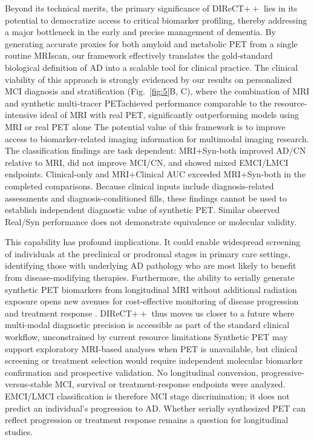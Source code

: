 \documentclass{article}
\providecommand{\DIFaddtex}[1]{{\protect\color{blue} \sf #1}} %
\providecommand{\DIFdeltex}[1]{{\protect\color{red} \scriptsize #1}} %
\providecommand{\DIFaddbegin}{} %
\providecommand{\DIFaddend}{} %
\providecommand{\DIFdelbegin}{} %
\providecommand{\DIFdelend}{} %
\providecommand{\DIFadd}[1]{\texorpdfstring{\DIFaddtex{#1}}{#1}} %
\providecommand{\DIFdel}[1]{\texorpdfstring{\DIFdeltex{#1}}{}} %
\newcommand{\DIFscaledelfig}{0.5}
\newlength{\DIFdelgraphicswidth} %
\newlength{\DIFdelgraphicsheight} %
\newcommand{\DIFaddincludegraphics}[2][]{{\color{blue}\fbox{\DIFOincludegraphics[#1]{#2}}}} %
\newcommand{\DIFdelincludegraphics}[2][]{%
\sbox{\DIFdelgraphicsbox}{\DIFOincludegraphics[#1]{#2}}%
\settoboxwidth{\DIFdelgraphicswidth}{\DIFdelgraphicsbox} %
\settoboxtotalheight{\DIFdelgraphicsheight}{\DIFdelgraphicsbox} %
\scalebox{\DIFscaledelfig}{%
\parbox[b]{\DIFdelgraphicswidth}{\usebox{\DIFdelgraphicsbox}\\[-\baselineskip] \rule{\DIFdelgraphicswidth}{0em}}\llap{\resizebox{\DIFdelgraphicswidth}{\DIFdelgraphicsheight}{%
\setlength{\unitlength}{\DIFdelgraphicswidth}%
\begin{picture}(1,1)%
\thicklines\linethickness{2pt} %
{\color[rgb]{1,0,0}\put(0,0){\framebox(1,1){}}}%
{\color[rgb]{1,0,0}\put(0,0){\line( 1,1){1}}}%
{\color[rgb]{1,0,0}\put(0,1){\line(1,-1){1}}}%
\end{picture}%
}\hspace*{3pt}}} %
} %
\DeclareRobustCommand{\DIFaddbegin}{\DIFOaddbegin \let\includegraphics\DIFaddincludegraphics} %
\DeclareRobustCommand{\DIFaddend}{\DIFOaddend \let\includegraphics\DIFOincludegraphics} %
\DeclareRobustCommand{\DIFdelbegin}{\DIFOdelbegin \let\includegraphics\DIFdelincludegraphics} %
\DeclareRobustCommand{\DIFdelend}{\DIFOaddend \let\includegraphics\DIFOincludegraphics} %
\begin{document}
\DIFdelbegin \DIFdel{Beyond its technical merits, the primary significance of DIReCT$++$ lies in its potential to democratize access to critical biomarker profiling, thereby addressing a major bottleneck in the early and precise management of dementia. By generating accurate proxies for both amyloid and metabolic PET from a single routine MRIscan, our framework effectively translates the gold-standard biological definition of AD into a scalable tool for clinical practice. The clinical viability of this approach is strongly evidenced by our results on personalized MCI diagnosis and stratification (Fig.~\ref{fig:5}B, C), where the combination of MRI and synthetic multi-tracer PETachieved performance comparable to the resource-intensive ideal of MRI with real PET, significantly outperforming models using MRI or real PET alone}\DIFdelend \DIFaddbegin \DIFadd{The potential value of this framework is to improve access to biomarker-related imaging information for multimodal imaging research. The classification findings are task dependent: MRI+Syn-both improved AD/CN relative to MRI, did not improve MCI/CN, and showed mixed EMCI/LMCI endpoints. Clinical-only and MRI+Clinical AUC exceeded MRI+Syn-both in the completed comparisons. Because clinical inputs include diagnosis-related assessments and diagnosis-conditioned fills, these findings cannot be used to establish independent diagnostic value of synthetic PET. Similar observed Real/Syn performance does not demonstrate equivalence or molecular validity}\DIFaddend .

\DIFdelbegin \DIFdel{This capability has profound implications. It could enable widespread screening of individuals at the preclinical or prodromal stages in primary care settings, identifying those with underlying AD pathology who are most likely to benefit from disease-modifying therapies. Furthermore, the ability to serially generate synthetic PET biomarkers from longitudinal MRI without additional radiation exposure opens new avenues for cost-effective monitoring of disease progression and treatment response . DIReCT$++$ thus moves us closer to a future where multi-modal diagnostic precision is accessible as part of the standard clinical workflow, unconstrained by current resource limitations}\DIFdelend \DIFaddbegin \DIFadd{Synthetic PET may support exploratory MRI-based analyses when PET is unavailable, but clinical screening or treatment selection would require independent molecular biomarker confirmation and prospective validation. No longitudinal conversion, progressive-versus-stable MCI, survival or treatment-response endpoints were analyzed. EMCI/LMCI classification is therefore MCI stage discrimination; it does not predict an individual's progression to AD. Whether serially synthesized PET can reflect progression or treatment response remains a question for longitudinal studies}\DIFaddend .
\end{document}
